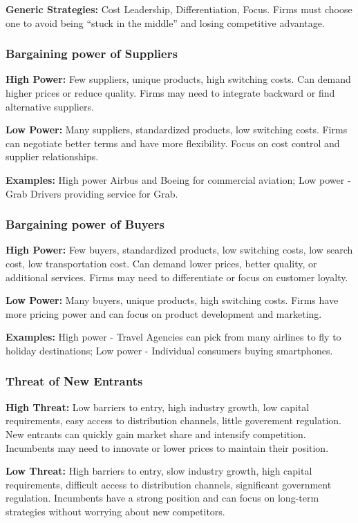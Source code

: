 \textbf{Generic Strategies:} Cost Leadership, Differentiation, Focus. Firms must choose
one to avoid being ``stuck in the middle'' and losing competitive advantage.

\subsubsection{Bargaining power of Suppliers}

\textbf{High Power:} Few suppliers, unique products, high switching costs. Can demand
higher prices or reduce quality. Firms may need to integrate backward or find
alternative suppliers.

\textbf{Low Power:} Many suppliers, standardized products, low switching costs. Firms
can negotiate better terms and have more flexibility. Focus on cost control and
supplier relationships.

\textbf{Examples:} High power Airbus and Boeing for commercial aviation; Low power -
Grab Drivers providing service for Grab.

\subsubsection{Bargaining power of Buyers}
\textbf{High Power:} Few buyers, standardized products, low switching costs, low search
cost, low transportation cost. Can demand lower prices, better quality, or
additional services. Firms may need to differentiate or focus on customer
loyalty.

\textbf{Low Power:} Many buyers, unique products, high switching costs. Firms have more
pricing power and can focus on product development and marketing.

\textbf{Examples:} High power - Travel Agencies can pick from many airlines to fly to
holiday destinations; Low power - Individual consumers buying smartphones.

\subsubsection{Threat of New Entrants}
\textbf{High Threat:} Low barriers to entry, high industry growth, low capital
requirements, easy access to distribution channels, little goverement
regulation. New entrants can quickly gain market share and intensify
competition. Incumbents may need to innovate or lower prices to maintain their
position.

\textbf{Low Threat:} High barriers to entry, slow industry growth, high capital
requirements, difficult access to distribution channels, significant government
regulation. Incumbents have a strong position and can focus on long-term
strategies without worrying about new competitors.

